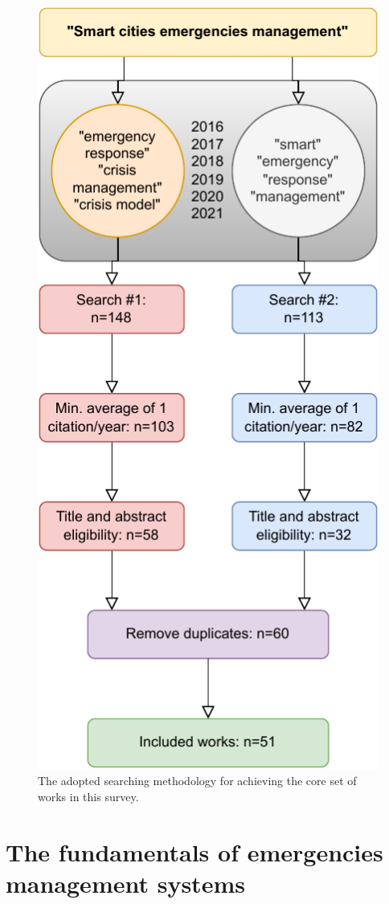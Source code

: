 \begin{refsection}
\begin{figure}[htb]
  \centering
  \includegraphics{Chapters/2-Survey/images/fluxograma.pdf}
  \caption{The adopted searching methodology for achieving the core set of works in this survey.}\label{fig:workflow}
\end{figure}

\section {The fundamentals of emergencies management systems}\label{sec3}


\end{refsection}
